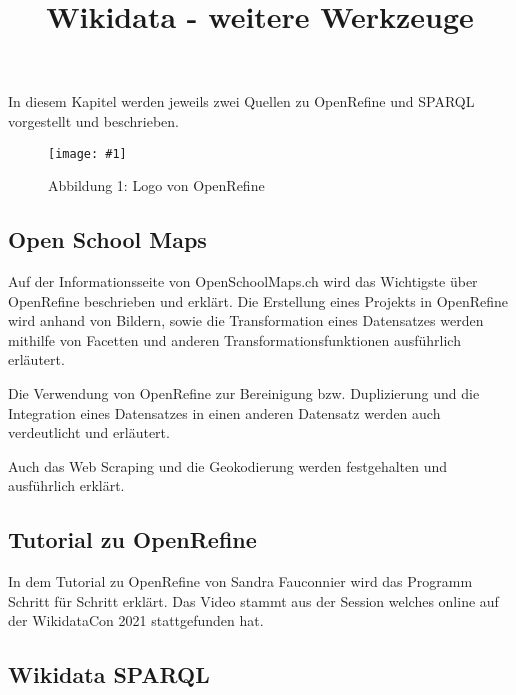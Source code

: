 \documentclass{article}
\newlength{\imgwidth}
\newcommand\scaledgraphics[2]{%
                
\settowidth{\imgwidth}{\texttt{[image: \#1]}}%
                
\setlength{\imgwidth}{\minof{\imgwidth}{#2\textwidth}}%
                
\texttt{[image: \#1]}%
                
}
\begin{document}
\title{Wikidata - weitere Werkzeuge}

\maketitle





In diesem Kapitel werden jeweils zwei Quellen zu OpenRefine und SPARQL vorgestellt und beschrieben.

\begin{figure}
\scaledgraphics{5c3fefe0-3802-4032-a442-66cfe33e8be3.png}{0.5}
\caption*{Abbildung 1: Logo von OpenRefine}\label{F25599931}
\end{figure}





\subsection{Open School Maps}\label{H1052681}



Auf der Informationsseite von OpenSchoolMaps.ch \autocite{openschoolmapsch_daten_nodate} wird das Wichtigste über OpenRefine beschrieben und erklärt. Die Erstellung eines Projekts in OpenRefine wird anhand von Bildern, sowie die Transformation eines Datensatzes werden mithilfe von Facetten und anderen Transformationsfunktionen ausführlich erläutert.


Die Verwendung von OpenRefine zur Bereinigung bzw. Duplizierung und die Integration eines Datensatzes in einen anderen Datensatz werden auch verdeutlicht und erläutert.


Auch das Web Scraping und die Geokodierung werden festgehalten und ausführlich erklärt.


\subsection{Tutorial zu OpenRefine}\label{H8107403}



In dem Tutorial zu OpenRefine \autocite{wikimediade_openrefine_2022} von Sandra Fauconnier wird das Programm Schritt für Schritt erklärt. Das Video stammt aus der Session welches online auf der WikidataCon 2021 stattgefunden hat.





\subsection{Wikidata SPARQL }\label{H4162303}
\end{document}
